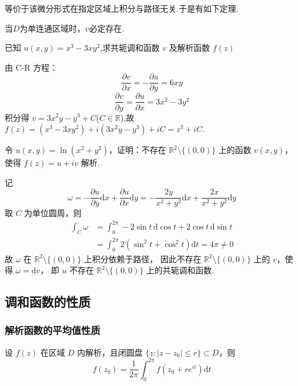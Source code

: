 \documentclass[openany,oneside]{ctexbook}
\begin{document}
等价于该微分形式在指定区域上积分与路径无关.于是有如下定理.
\begin{theorem}
  当$D$为单连通区域时，$v$必定存在.
\end{theorem}

\begin{example}
已知 $u(x,y) = x^3 - 3xy^2$,求共轭调和函数 $v$ 及解析函数 $f(z)$
\end{example}
\begin{solution}
由 C-R 方程：
\[
\frac{\partial v}{\partial x} = -\frac{\partial u}{\partial y} = 6xy\]
\[\frac{\partial v}{\partial y} = \frac{\partial u}{\partial x} = 3x^2 - 3y^2
\]
积分得 $v = 3x^2y - y^3 + C$($C \in \mathbb{R}$),故 $f(z) = (x^3 - 3xy^2) + i(3x^2y - y^3) + iC = z^3 + iC$.
\end{solution}
\begin{example}
令 \( u(x,y)=\ln(x^2+y^2) \)，证明：不存在 \( \mathbb{R}^2\setminus\{(0,0)\} \) 上的函数
\( v(x,y) \)，使得 \( f(z)=u+iv \) 解析.
\end{example}
\begin{solution}
记
\[
\omega = -\frac{\partial u}{\partial y}\mathrm{d}x + \frac{\partial u}{\partial x}\mathrm{d}y
= -\frac{2y}{x^2+y^2}\mathrm{d}x + \frac{2x}{x^2+y^2}\mathrm{d}y
\]
取 \( C \) 为单位圆周，则
\[
\begin{aligned}
\int_C \omega &= \int_0^{2\pi} -2\sin t \, \mathrm{d}\cos t + 2\cos t \, \mathrm{d}\sin t \\
&= \int_0^{2\pi} 2(\sin^2 t + \cos^2 t) \mathrm{d}t = 4\pi \neq 0
\end{aligned}
\]
故 \( \omega \) 在 \( \mathbb{R}^2\setminus\{(0,0)\} \) 上积分依赖于路径，
因此不存在 \( \mathbb{R}^2\setminus\{(0,0)\} \) 上的 \( v \)，使得 \( \omega = \mathrm{d}v \)，
即 \( u \) 不存在 \( \mathbb{R}^2\setminus\{(0,0)\} \) 上的共轭调和函数.
\end{solution}
\subsection{调和函数的性质}
\subsubsection{解析函数的平均值性质}
\begin{theorem}
设 \( f(z) \) 在区域 \( D \) 内解析，且闭圆盘 \( \{z:|z-z_0|\le r\}\subset D \)，则
\[
f(z_0)=\frac{1}{2\pi}\int_0^{2\pi}f(z_0+re^{it})\mathrm{d}t
\]
\end{theorem}
\end{document}
